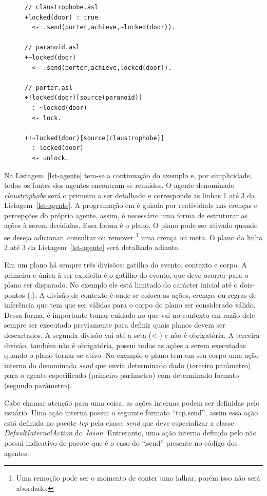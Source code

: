 \lstset{linewidth=75mm}
\begin{figure}
	\begin{lstlisting}[frame=trbl, caption=Agentes em ASL, label=lst-agente]
// claustrophobe.asl
+locked(door) : true
  <- .send(porter,achieve,~locked(door)).

// paranoid.asl
+~locked(door)
  <- .send(porter,achieve,locked(door)).

// porter.asl
+!locked(door)[source(paranoid)]
  : ~locked(door)
  <- lock.

+!~locked(door)[source(claustrophobe)]
  : locked(door)
  <- unlock.
	\end{lstlisting}
\end{figure}
%
Na Listagem~\ref{lst-agente} tem-se a continuação do exemplo e, por
simplicidade, todos os fontes dos agentes encontram-se reunidos. O agente denominado
\emph{claustrophobe} será o primeiro a ser detalhado e corresponde as linhas 1 até 3
da Listagem~\ref{lst-agente}. A programação em \jason é
guiada por reatividade nas crenças e percepções do próprio agente, assim, é necessário
uma forma de estruturar as ações à serem decididas. Essa forma é o plano.
O plano pode ser ativado quando se deseja adicionar, consultar ou remover \footnote{Uma remoção pode ser o momento de conter uma falhar, porém isso não será abordado.}
 uma crença ou meta. O plano da linha 2 até 3 da
Listagem~\ref{lst-agente} será detalhado adiante.

Em um plano há sempre três divisões: gatilho do evento, contexto e corpo.
A primeira e única à ser explicita é o gatilho do evento, que deve ocorrer para
o plano ser disparado. No exemplo ele está limitado do carácter inicial até
o dois-pontos (:). A divisão de contexto é onde se coloca as ações, crenças
ou regras de inferência que tem que ser válidas para o corpo do plano ser
considerado válido. Dessa forma, é
importante tomar cuidado no que vai no contexto em razão dele sempre ser
executado previamente para definir quais planos devem ser descartados.
A segunda divisão vai até a seta (<-) e não é obrigatória.
A terceira divisão, também não é obrigatória, possui todas as ações a serem
executadas quando o plano tornar-se ativo. No exemplo o plano tem em seu corpo
uma ação interna do \jason denominada \emph{send} que envia determinado dado
(terceiro parâmetro) para o agente especificado (primeiro parâmetro) com
determinado formato (segundo parâmetro).

Cabe chamar atenção para uma coisa, as ações internas podem ser definidas pelo
usuário. Uma ação interna possui o seguinte formato ``tcp.send'', assim essa
ação está definida no pacote \emph{tcp} pela classe \emph{send} que
deve especializar a classe \emph{DefaultInternalAction} do \emph{Jason}.
Entretanto, uma ação interna definida pelo \jason não possui indicativo de
pacote que é o caso do ``.send'' presente no código dos agentes.

